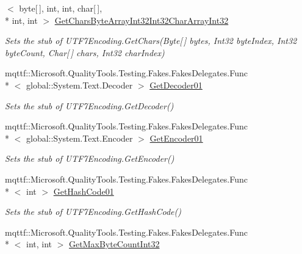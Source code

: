 \begin{DoxyCompactItemize}
$<$ byte\mbox{[}$\,$\mbox{]}, int, int, char\mbox{[}$\,$\mbox{]}, \\*
int, int $>$ \hyperlink{class_system_1_1_text_1_1_fakes_1_1_stub_u_t_f7_encoding_ac0fdabd76fe2ed1b6f2fdaeb6ea68746}{Get\-Chars\-Byte\-Array\-Int32\-Int32\-Char\-Array\-Int32}
\begin{DoxyCompactList}\small\item\em Sets the stub of U\-T\-F7\-Encoding.\-Get\-Chars(\-Byte\mbox{[}$\,$\mbox{]} bytes, Int32 byte\-Index, Int32 byte\-Count, Char\mbox{[}$\,$\mbox{]} chars, Int32 char\-Index)\end{DoxyCompactList}\item 
mqttf\-::\-Microsoft.\-Quality\-Tools.\-Testing.\-Fakes.\-Fakes\-Delegates.\-Func\\*
$<$ global\-::\-System.\-Text.\-Decoder $>$ \hyperlink{class_system_1_1_text_1_1_fakes_1_1_stub_u_t_f7_encoding_a88ff163da3f74ae17e7c7ccba80b0692}{Get\-Decoder01}
\begin{DoxyCompactList}\small\item\em Sets the stub of U\-T\-F7\-Encoding.\-Get\-Decoder()\end{DoxyCompactList}\item 
mqttf\-::\-Microsoft.\-Quality\-Tools.\-Testing.\-Fakes.\-Fakes\-Delegates.\-Func\\*
$<$ global\-::\-System.\-Text.\-Encoder $>$ \hyperlink{class_system_1_1_text_1_1_fakes_1_1_stub_u_t_f7_encoding_a44f13c8196a71b73db98dc5e492024d1}{Get\-Encoder01}
\begin{DoxyCompactList}\small\item\em Sets the stub of U\-T\-F7\-Encoding.\-Get\-Encoder()\end{DoxyCompactList}\item 
mqttf\-::\-Microsoft.\-Quality\-Tools.\-Testing.\-Fakes.\-Fakes\-Delegates.\-Func\\*
$<$ int $>$ \hyperlink{class_system_1_1_text_1_1_fakes_1_1_stub_u_t_f7_encoding_ae766defe3aacfd960eea23d5e82c710f}{Get\-Hash\-Code01}
\begin{DoxyCompactList}\small\item\em Sets the stub of U\-T\-F7\-Encoding.\-Get\-Hash\-Code()\end{DoxyCompactList}\item 
mqttf\-::\-Microsoft.\-Quality\-Tools.\-Testing.\-Fakes.\-Fakes\-Delegates.\-Func\\*
$<$ int, int $>$ \hyperlink{class_system_1_1_text_1_1_fakes_1_1_stub_u_t_f7_encoding_a99c4e8d76b093fbfcec27f4443fbff77}{Get\-Max\-Byte\-Count\-Int32}

\end{DoxyCompactItemize}
